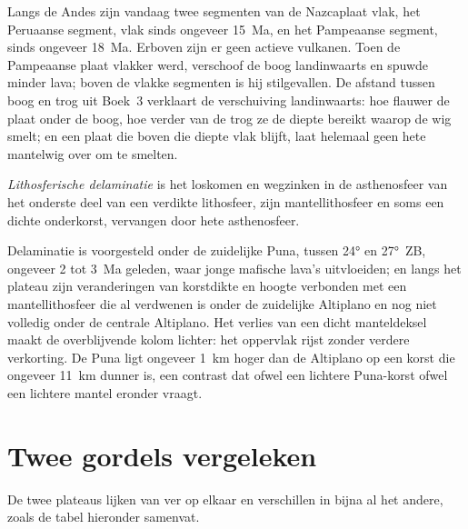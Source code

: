 Langs de Andes zijn vandaag twee segmenten van de Nazcaplaat vlak, het Peruaanse segment, vlak
sinds ongeveer \qty{15}{Ma}, en het Pampeaanse segment, sinds ongeveer \qty{18}{Ma}. Erboven zijn er
geen actieve vulkanen. Toen de Pampeaanse plaat vlakker werd, verschoof de boog landinwaarts en spuwde
minder lava; boven de vlakke segmenten is hij stilgevallen. De afstand tussen boog en trog uit Boek~3
verklaart de verschuiving landinwaarts: hoe flauwer de plaat onder de boog, hoe verder van de trog ze
de diepte bereikt waarop de wig smelt; en een plaat die boven die diepte vlak blijft, laat
helemaal geen hete mantelwig over om te smelten.

\begin{definition}\label{def:b2:himalaya-andes:delamination}
\emph{Lithosferische delaminatie} is het loskomen en
wegzinken in de asthenosfeer van het onderste deel van een verdikte lithosfeer, zijn
mantellithosfeer en soms een dichte onderkorst, vervangen door hete asthenosfeer.
\end{definition}

Delaminatie is voorgesteld onder de zuidelijke Puna, tussen \ang{24} en \ang{27}~ZB,
ongeveer 2 tot \qty{3}{Ma} geleden, waar jonge mafische lava's uitvloeiden; en langs het plateau zijn veranderingen
van korstdikte en hoogte verbonden met een mantellithosfeer die al verdwenen is
onder de zuidelijke Altiplano en nog niet volledig onder de centrale Altiplano. Het verlies van een
dicht manteldeksel maakt de overblijvende kolom lichter: het oppervlak rijst zonder verdere
verkorting. De Puna ligt ongeveer \qty{1}{km} hoger dan de Altiplano op een korst die ongeveer
\qty{11}{km} dunner is, een contrast dat ofwel een lichtere Puna-korst ofwel een lichtere mantel
eronder vraagt.

\section{Twee gordels vergeleken}\label{sec:b2:himalaya-andes:compared}

De twee plateaus lijken van ver op elkaar en verschillen in bijna al het andere, zoals de tabel
hieronder samenvat.

